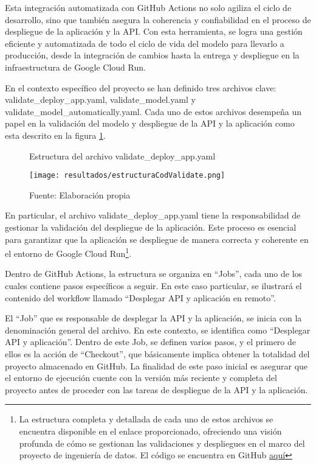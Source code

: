Esta integración automatizada con GitHub Actions no solo agiliza el ciclo de desarrollo, sino que también asegura la coherencia y confiabilidad en el proceso de despliegue de la aplicación y la API. Con esta herramienta, se logra una gestión eficiente y automatizada de todo el ciclo de vida del modelo para llevarlo a producción, desde la integración de cambios hasta la entrega y despliegue en la infraestructura de Google Cloud Run. \newline

En el contexto específico del proyecto se han definido tres archivos clave: \\ validate\_deploy\_app.yaml, validate\_model.yaml y validate\_model\_automatically.yaml. Cada uno de estos archivos desempeña un papel en la validación del modelo y despliegue de la API y la aplicación como esta descrito en la figura \ref{fig:figuraEstructuraCodValidate}. 


\newpage

\begin{figure}[h]
	\centering
	\caption{Estructura del archivo validate\_deploy\_app.yaml}
	\texttt{[image: resultados/estructuraCodValidate.png]}
	\caption*{\footnotesize Fuente: Elaboración propia}
	\label{fig:figuraEstructuraCodValidate}
\end{figure}

En particular, el archivo validate\_deploy\_app.yaml tiene la responsabilidad de gestionar la validación del despliegue de la aplicación. Este proceso es esencial para garantizar que la aplicación se despliegue de manera correcta y coherente en el entorno de Google Cloud Run\footnote{La estructura completa y detallada de cada uno de estos archivos se encuentra disponible en el enlace proporcionado, ofreciendo una visión profunda de cómo se gestionan las validaciones y despliegues en el marco del proyecto de ingeniería de datos. El código se encuentra en GitHub \href{https://github.com/juferoto/mlops_project/tree/master/.github/workflows}{aquí}}. \newline

Dentro de GitHub Actions, la estructura se organiza en ``Jobs'', cada uno de los cuales contiene pasos específicos a seguir. En este caso particular, se ilustrará el contenido del workflow llamado ``Desplegar API y aplicación en remoto''. \newline

El ``Job'' que es responsable de desplegar la API y la aplicación, se inicia con la denominación general del archivo. En este contexto, se identifica como ``Desplegar API y aplicación''. Dentro de este Job, se definen varios pasos, y el primero de ellos es la acción de ``Checkout'', que básicamente implica obtener la totalidad del proyecto almacenado en GitHub. La finalidad de este paso inicial es asegurar que el entorno de ejecución cuente con la versión más reciente y completa del proyecto antes de proceder con las tareas de despliegue de la API y la aplicación.

